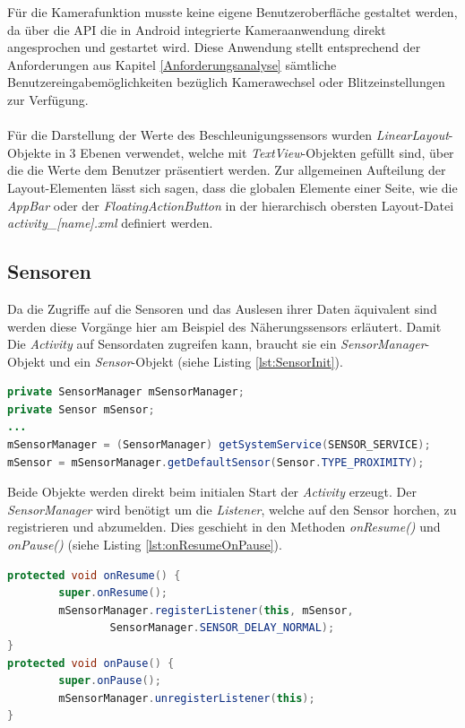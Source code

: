 Für die Kamerafunktion musste keine eigene Benutzeroberfläche gestaltet werden, da über die API die in Android integrierte Kameraanwendung direkt angesprochen und gestartet wird. Diese Anwendung stellt entsprechend der Anforderungen aus Kapitel \ref{Anforderungsanalyse} sämtliche Benutzereingabemöglichkeiten bezüglich Kamerawechsel oder Blitzeinstellungen zur Verfügung. 
\\
\\
Für die Darstellung der Werte des Beschleunigungssensors wurden \textit{LinearLayout}-Objekte in 3 Ebenen verwendet, welche mit \textit{TextView}-Objekten gefüllt sind, über die die Werte dem Benutzer präsentiert werden. Zur allgemeinen Aufteilung der Layout-Elementen lässt sich sagen, dass die globalen Elemente einer Seite, wie die \textit{AppBar} oder der \textit{FloatingActionButton} in der hierarchisch obersten Layout-Datei \textit{activity\_[name].xml} definiert werden.

\subsection*{Sensoren} \label{ImplNativSensors}

Da die Zugriffe auf die Sensoren und das Auslesen ihrer Daten äquivalent sind werden diese Vorgänge hier am Beispiel des Näherungssensors erläutert. Damit Die \textit{Activity} auf Sensordaten zugreifen kann, braucht sie ein \textit{SensorManager}-Objekt und ein \textit{Sensor}-Objekt (siehe Listing \ref{lst:SensorInit}).

\begin{lstlisting}[caption=Definition und Initialisierung von Sensor und SensorManager, label=lst:SensorInit, language=Java]
private SensorManager mSensorManager;
private Sensor mSensor;
...
mSensorManager = (SensorManager) getSystemService(SENSOR_SERVICE);
mSensor = mSensorManager.getDefaultSensor(Sensor.TYPE_PROXIMITY);
\end{lstlisting} 

Beide Objekte werden direkt beim initialen Start der \textit{Activity} erzeugt. Der \textit{SensorManager} wird benötigt um die \textit{Listener}, welche auf den Sensor horchen, zu registrieren und abzumelden. Dies geschieht in den Methoden \textit{onResume()} und \textit{onPause()} (siehe Listing \ref{lst:onResumeOnPause}). 
\clearpage

\begin{lstlisting}[caption=Die Methoden \textit{onResume()} und \textit{onPause()}, label=lst:onResumeOnPause, language=Java]
protected void onResume() {
        super.onResume();
        mSensorManager.registerListener(this, mSensor,
                SensorManager.SENSOR_DELAY_NORMAL);
}
protected void onPause() {
        super.onPause();
        mSensorManager.unregisterListener(this);
}
\end{lstlisting} 

